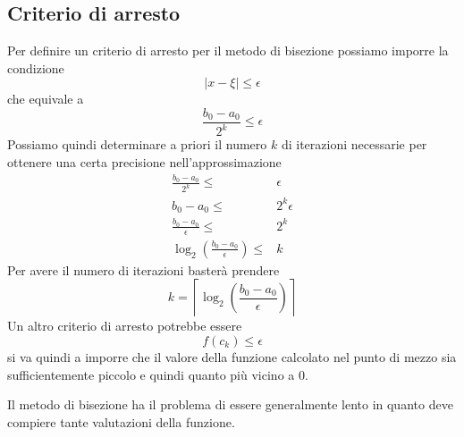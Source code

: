 \subsection{Criterio di arresto}
Per definire un criterio di arresto per il metodo di bisezione possiamo imporre la condizione
\[ |x - \xi| \leq \epsilon \]
che equivale a
\[ \frac{b_0 - a_0}{2^k} \leq \epsilon \]
Possiamo quindi determinare a priori il numero $k$ di iterazioni necessarie per ottenere una certa precisione
nell'approssimazione
\begin{align*}
	\frac{b_0 - a_0}{2^k} \leq                            & \epsilon     \\
	b_0 - a_0 \leq                                        & 2^k \epsilon \\
	\frac{b_0 - a_0}{\epsilon} \leq                       & 2^k          \\
	\log_2 \left( \frac{b_0 - a_0}{\epsilon} \right) \leq & k
\end{align*}
Per avere il numero di iterazioni basterà prendere
\[ k = \left\lceil \log_2 \left( \frac{b_0 - a_0}{\epsilon} \right) \right\rceil \]
Un altro criterio di arresto potrebbe essere
\[ f(c_k) \leq \epsilon \]
si va quindi a imporre che il valore della funzione calcolato nel punto di mezzo sia sufficientemente piccolo
e quindi quanto più vicino a 0.

Il metodo di bisezione ha il problema di essere generalmente lento in quanto deve compiere tante valutazioni
della funzione.
